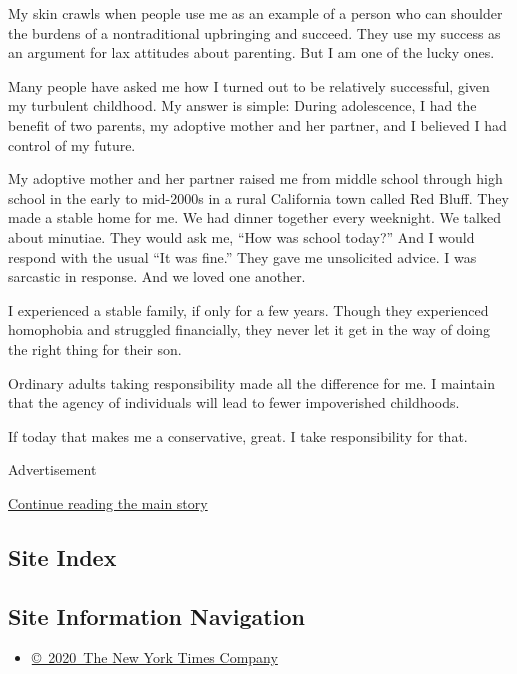 My skin crawls when people use me as an example of a person who can
shoulder the burdens of a nontraditional upbringing and succeed. They
use my success as an argument for lax attitudes about parenting. But I
am one of the lucky ones.

Many people have asked me how I turned out to be relatively successful,
given my turbulent childhood. My answer is simple: During adolescence, I
had the benefit of two parents, my adoptive mother and her partner, and
I believed I had control of my future.

My adoptive mother and her partner raised me from middle school through
high school in the early to mid-2000s in a rural California town called
Red Bluff. They made a stable home for me. We had dinner together every
weeknight. We talked about minutiae. They would ask me, ``How was school
today?'' And I would respond with the usual ``It was fine.'' They gave
me unsolicited advice. I was sarcastic in response. And we loved one
another.

I experienced a stable family, if only for a few years. Though they
experienced homophobia and struggled financially, they never let it get
in the way of doing the right thing for their son.

Ordinary adults taking responsibility made all the difference for me. I
maintain that the agency of individuals will lead to fewer impoverished
childhoods.

If today that makes me a conservative, great. I take responsibility for
that.

Advertisement

\protect\hyperlink{after-bottom}{Continue reading the main story}

\hypertarget{site-index}{%
\subsection{Site Index}\label{site-index}}

\hypertarget{site-information-navigation}{%
\subsection{Site Information
Navigation}\label{site-information-navigation}}

\begin{itemize}
\tightlist
\item
  \href{https://help.nytimes.com/hc/en-us/articles/115014792127-Copyright-notice}{©~2020~The
  New York Times Company}
\end{itemize}

